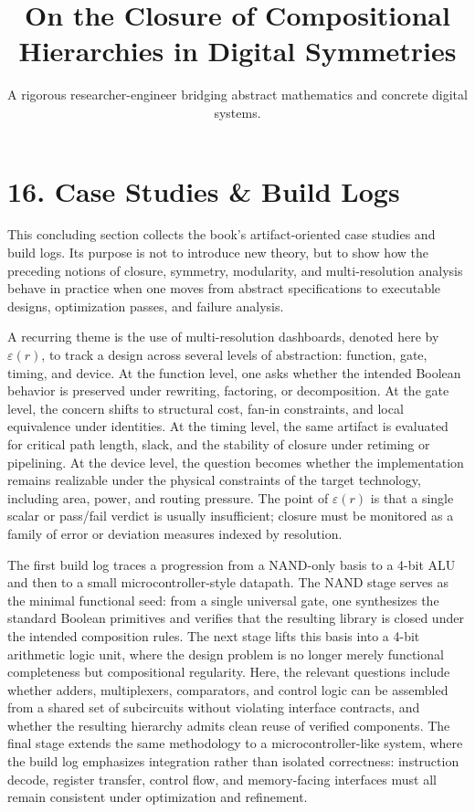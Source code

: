 \documentclass[11pt]{article}
\title{On the Closure of Compositional Hierarchies in Digital Symmetries}
\author{A rigorous researcher-engineer bridging abstract mathematics and concrete digital systems.}
\begin{document}
\section*{16. Case Studies \& Build Logs}

This concluding section collects the book's artifact-oriented case studies and build logs. Its purpose is not to introduce new theory, but to show how the preceding notions of closure, symmetry, modularity, and multi-resolution analysis behave in practice when one moves from abstract specifications to executable designs, optimization passes, and failure analysis.

A recurring theme is the use of multi-resolution dashboards, denoted here by \(\varepsilon(r)\), to track a design across several levels of abstraction: function, gate, timing, and device. At the function level, one asks whether the intended Boolean behavior is preserved under rewriting, factoring, or decomposition. At the gate level, the concern shifts to structural cost, fan-in constraints, and local equivalence under identities. At the timing level, the same artifact is evaluated for critical path length, slack, and the stability of closure under retiming or pipelining. At the device level, the question becomes whether the implementation remains realizable under the physical constraints of the target technology, including area, power, and routing pressure. The point of \(\varepsilon(r)\) is that a single scalar or pass/fail verdict is usually insufficient; closure must be monitored as a family of error or deviation measures indexed by resolution.

The first build log traces a progression from a NAND-only basis to a 4-bit ALU and then to a small microcontroller-style datapath. The NAND stage serves as the minimal functional seed: from a single universal gate, one synthesizes the standard Boolean primitives and verifies that the resulting library is closed under the intended composition rules. The next stage lifts this basis into a 4-bit arithmetic logic unit, where the design problem is no longer merely functional completeness but compositional regularity. Here, the relevant questions include whether adders, multiplexers, comparators, and control logic can be assembled from a shared set of subcircuits without violating interface contracts, and whether the resulting hierarchy admits clean reuse of verified components. The final stage extends the same methodology to a microcontroller-like system, where the build log emphasizes integration rather than isolated correctness: instruction decode, register transfer, control flow, and memory-facing interfaces must all remain consistent under optimization and refinement.
\end{document}
